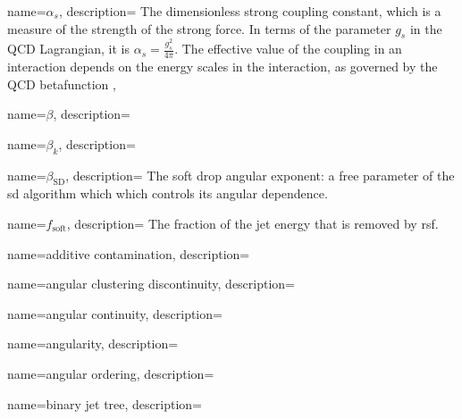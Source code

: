 {
  name={\ensuremath{\alpha_s}},
  description={
      The dimensionless strong coupling constant, which is a measure of the strength of the strong force.
      In terms of the parameter \(g_s\) in the QCD Lagrangian, it is \(\alpha_s = \frac{g_s^2}{4\pi}\).
      The effective value of the coupling in an interaction depends on the energy scales in the interaction, as governed by the QCD \gls{betafunction}
},
}

{
    name={\ensuremath{\beta}},
    description={
    }
}

{
    name={\ensuremath{\beta_k}},
    description={
    }
}

{
    name={\ensuremath{\beta_\text{SD}}},
    description={
        The soft drop angular exponent:
        a free parameter of the \gls{sd} algorithm which which controls its angular dependence.
    }
}

{
    name={\ensuremath{f_{\text{soft}}}},
    description={
        The fraction of the jet energy that is removed by \gls{rsf}.
    }
}


{
    name=additive contamination,
    description={
    }
}


{
    name=angular clustering discontinuity,
    description={
    }
}

{
    name=angular continuity,
    description={
    }
}

{
    name=angularity,
    description={
    }
}

{
    name=angular ordering,
    description={
    }
}


{
    name=binary jet tree,
    description={
    }
}

